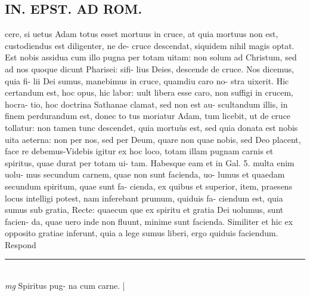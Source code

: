 \documentclass{article}
\begin{document}
\begin{pages}
\section*{IN. EPST. AD ROM.  }
\marginpar{[ p.69 ]}\pstart cere, si uetus Adam totus esset mortuus in cruce, at quia mortuus non est, custodiendus est diligenter, ne de- cruce descendat, siquidem nihil magis optat. Est nobis assidua cum illo pugna per totam uitam: non solum ad Christum, sed ad nos quoque dicunt Pharisei: sifi- lius Deies, descende de cruce. Nos dicemus, quia fi- lii Dei sumus, manebimus in cruce, quamdiu caro no- stra uixerit. Hic certandum est, hoc opus, hic labor: uult libera esse caro, non suffigi in crucem, hocra- tio, hoc doctrina Sathanae clamat, sed non est au- scultandum illis, in finem perdurandum est, donec to tus moriatur Adam, tum licebit, ut de cruce tollatur: non tamen tunc descendet, quia mortuùs est, sed quia donata est nobis uita aeterna: non per nos, sed per Deum, quare non quae nobis, sed Deo placent, face re debemus-Videbis igitur ex hoc loco, totam illam pugnam carnis et spiritus, quae durat per totam ui- tam. Habesque eam et in Gal. 5. multa enim uolu- mus secundum carnem, quae non sunt facienda, uo- lumus et quaedam secundum spiritum, quae sunt fa- cienda, ex quibus et superior, item, praesens locus intelligi potest, nam inferebant prumum, quiduis fa- ciendum est, quia sumus sub gratia, Recte: quaecun que ex spiritu et gratia Dei uolumus, sunt facien- da, quae uero inde non fluunt, minime sunt facienda.  Similiter et hic ex opposito gratiae inferunt, quia a lege sumus liberi, ergo quiduis faciendum. Respond  \pend
\vspace{0.5cm}\noindent
\vspace{0.2cm}\rule{1cm}{0.2pt}\\ 
\hspace{0.2cm}\textit{mg}
\footnotesize Spiritus pug- na cum carne.  
\normalsize| 

\end{pages}
\end{document}
